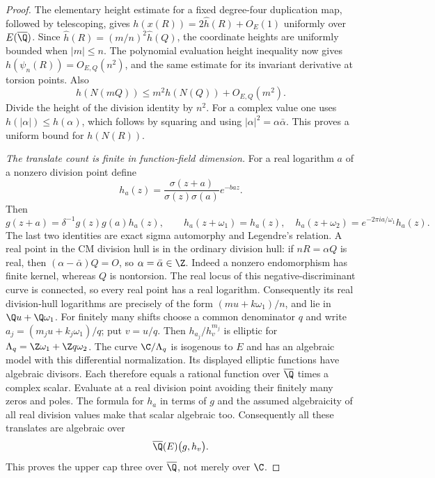\begin{proof}
The elementary height estimate for a fixed degree-four
duplication map, followed by telescoping, gives
$h(x(R))=2\widehat h(R)+O_E(1)$ uniformly over
$E(\overline\Q)$.  Since
$\widehat h(R)=(m/n)^2\widehat h(Q)$, the coordinate heights
are uniformly bounded when $|m|\leq n$.
The polynomial evaluation height inequality
\citep[Lemma 1.0]{gramain1986values} now gives
$h(\psi_n(R))=O_{E,Q}(n^2)$, and the same estimate for its
invariant derivative at torsion points.  Also
\[
 h(N(mQ))\leq m^2h(N(Q))+O_{E,Q}(m^2).
\]
Divide the height of the division identity by $n^2$.
For a complex value one uses
$h(|\alpha|)\leq h(\alpha)$, which follows by squaring and
using $|\alpha|^2=\alpha\bar\alpha$.
This proves a uniform bound for $h(N(R))$.

\emph{The translate count is finite in function-field dimension.}
For a real logarithm $a$ of a nonzero division point define
\[
 h_a(z)=\frac{\sigma(z+a)}{\sigma(z)\sigma(a)}e^{-baz}.
\]
Then
\[
 g(z+a)=\delta^{-1}g(z)g(a)h_a(z),\qquad
 h_a(z+\omega_1)=h_a(z),\quad
 h_a(z+\omega_2)=e^{-2\pi ia/\omega_1}h_a(z).
\]
The last two identities are exact sigma automorphy and Legendre's
relation.  A real point in the CM division hull is in the ordinary
division hull: if $nR=\alpha Q$ is real, then
$(\alpha-\bar\alpha)Q=O$, so $\alpha=\bar\alpha\in\Z$.
Indeed a nonzero endomorphism has finite kernel, whereas $Q$
is nontorsion.  The real locus of this negative-discriminant
curve is connected, so every real point has a real logarithm.
Consequently its real division-hull logarithms are precisely
of the form $(mu+k\omega_1)/n$, and lie in
$\Q u+\Q\omega_1$.
For finitely many shifts choose a common denominator
$q$ and write $a_j=(m_ju+k_j\omega_1)/q$; put $v=u/q$.
Then $h_{a_j}/h_v^{m_j}$ is elliptic for
$\Lambda_q=\Z\omega_1+\Z q\omega_2$.
The curve $\C/\Lambda_q$ is isogenous to $E$ and has an
algebraic model with this differential normalization.
Its displayed elliptic functions have algebraic divisors.
Each therefore equals a rational function over $\overline\Q$
times a complex scalar.  Evaluate at a real division point
avoiding their finitely many zeros and poles.  The formula
for $h_a$ in terms of $g$ and the assumed algebraicity of all
real division values make that scalar algebraic too.
Consequently all these translates are algebraic over
\[
 \overline\Q(E)\bigl(g,h_v\bigr).
\]
This proves the upper cap three over $\overline\Q$, not merely
over $\C$.


\end{proof}
